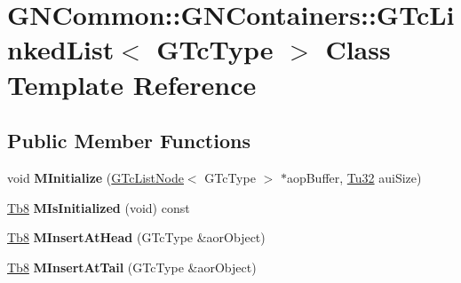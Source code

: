 \hypertarget{class_g_n_common_1_1_g_n_containers_1_1_g_tc_linked_list}{}\section{G\+N\+Common\+:\+:G\+N\+Containers\+:\+:G\+Tc\+Linked\+List$<$ G\+Tc\+Type $>$ Class Template Reference}
\label{class_g_n_common_1_1_g_n_containers_1_1_g_tc_linked_list}
\subsection*{Public Member Functions}
\begin{DoxyCompactItemize}
\item 
\mbox{\label{class_g_n_common_1_1_g_n_containers_1_1_g_tc_linked_list_a6c89b58cfe17103526f7f6734b863217}} 
void {\bfseries M\+Initialize} (\mbox{\hyperlink{class_g_n_common_1_1_g_n_containers_1_1_g_tc_list_node}{G\+Tc\+List\+Node}}$<$ G\+Tc\+Type $>$ $\ast$aop\+Buffer, \mbox{\hyperlink{namespace_g_n_common_a941b527ef318f318aed7903dc832b7e4}{Tu32}} aui\+Size)
\item 
\mbox{\label{class_g_n_common_1_1_g_n_containers_1_1_g_tc_linked_list_a1c82041ef232d7930bd2265fd69354a9}} 
\mbox{\hyperlink{namespace_g_n_common_a8115dc7ed53b6e5b52e6bfde1632ea74}{Tb8}} {\bfseries M\+Is\+Initialized} (void) const
\item 
\mbox{\label{class_g_n_common_1_1_g_n_containers_1_1_g_tc_linked_list_a252f5ac54bc3d0cbdbc02768de894930}} 
\mbox{\hyperlink{namespace_g_n_common_a8115dc7ed53b6e5b52e6bfde1632ea74}{Tb8}} {\bfseries M\+Insert\+At\+Head} (G\+Tc\+Type \&aor\+Object)
\item 
\mbox{\label{class_g_n_common_1_1_g_n_containers_1_1_g_tc_linked_list_a0d1c79e290c1598b4c5453c0fa01f443}} 
\mbox{\hyperlink{namespace_g_n_common_a8115dc7ed53b6e5b52e6bfde1632ea74}{Tb8}} {\bfseries M\+Insert\+At\+Tail} (G\+Tc\+Type \&aor\+Object)
\item 
\mbox{\label{class_g_n_common_1_1_g_n_containers_1_1_g_tc_linked_list_a0d783863373f4d6821ddef003f4cc151}} 

\end{DoxyCompactItemize}
